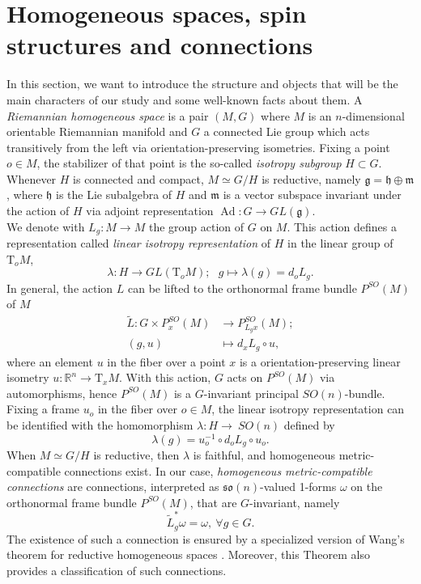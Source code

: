 \documentclass{article}
\numberwithin{equation}{section}
\theoremstyle{definition}
\newcommand{\R}{\mathbb{R}}
\newcommand{\g}{\mathfrak{g}}
\newcommand{\so}[1]{\mathfrak{so}(#1)}
\newcommand{\T}{\mathrm{T}}
\newcommand{\OF}[1]{P^{SO}(#1)}
\newcommand{\Ad}{\operatorname{Ad}}
\begin{document}
\section{Homogeneous spaces, spin structures and connections}
\label{sec:Rev}
In this section, we want to introduce the structure and objects that will be the main characters of our study and some well-known facts about them. A \textit{Riemannian homogeneous space} is a pair $(M,G)$ where $M$ is an $n$-dimensional orientable Riemannian manifold and $G$ a connected Lie group which acts transitively from the left via orientation-preserving isometries. Fixing a point $o\in M$, the stabilizer of that point is the so-called \textit{isotropy subgroup} $H\subset G$. Whenever $H$ is connected and compact, $M\simeq G/H$ is reductive, namely $\mathfrak{g}=\mathfrak{h}\oplus \mathfrak{m}$, where $\mathfrak{h}$ is the Lie subalgebra of $H$ and $\mathfrak{m}$ is a vector subspace invariant under the action of $H$ via adjoint representation $\Ad :G\to GL(\g)$.\\
We denote with $L_g:M\to M$ the group action of $G$ on $M$. This action defines a representation called \textit{linear isotropy representation} of $H$ in the linear group of $\T_oM$,
\begin{equation}
    \lambda: H \to GL(\T_oM);\ \ \  g\mapsto \lambda(g)=d_oL_g.
\end{equation}
In general, the action $L$ can be lifted to the orthonormal frame bundle $\OF{M}$ of $M$
\begin{align*}
    \tilde{L}:G\times P^{SO}_x(M) &\to P^{SO}_{L_g x}(M);\\
    (g,u) & \mapsto d_xL_g\circ u,
\end{align*}
where an element $u$ in the fiber over a point $x$ is a orientation-preserving linear isometry $u:\R^n\to \T_xM$. With this action, $G$ acts on $\OF{M}$ via automorphisms, hence $\OF{M}$ is a $G$-invariant principal $SO(n)$-bundle. Fixing a frame $u_o$ in the fiber over $o\in M$, the linear isotropy representation can be identified with the homomorphism $\lambda:H\to~SO(n)$ defined by
\[\lambda(g)=u_o^{-1}\circ d_oL_g\circ u_o.\]
When $M\simeq G/H$ is reductive, then $\lambda$ is faithful, and homogeneous metric-compatible connections exist. In our case, \textit{homogeneous metric-compatible connections} are connections, interpreted as $\so{n}$-valued 1-forms $\omega$ on the orthonormal frame bundle $\OF{M}$, that are $G$-invariant, namely
\[\tilde{L}_g^*\omega=\omega,\ \forall g\in G.\]
The existence of such a connection is ensured by a specialized version of Wang's theorem for reductive homogeneous spaces \cite{Kobayashi_Nomizu_1969}. Moreover, this Theorem also provides a classification of such connections.
\end{document}
